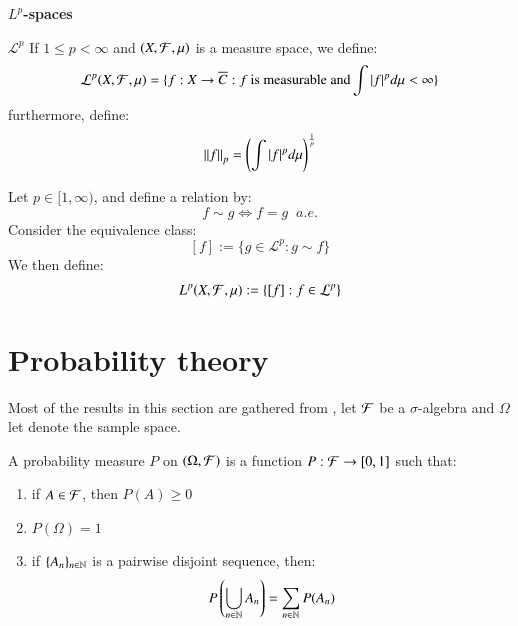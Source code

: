 \centerline{\textbf{$L^{p}$-spaces}}

\begin{definition}{\textbf{$\mathcal{L}^{p}$}}
If $1 \leq p < \infty$ and $(X,\mathcal{F}, \mu)$ is a measure space, we define: 
\begin{align*}
\mathcal{L}^{p}(X,\mathcal{F}, \mu) = 
\{
f:X \to \overline{C}: f\:\text{is measurable and}
\int |f|^{p}d\mu < \infty
\}
\end{align*}
furthermore, define: 
\begin{align*}
\norm{f}_{p} = \left(\int |f|^{p}d\mu \right)^{\frac{1}{p}}    
\end{align*}
\end{definition}

\begin{definition}[$L^{p}$]
Let $p \in [1,\infty)$, and define a relation by: 
\[
f \sim g \iff f = g\;\; a.e.
\] 
Consider the equivalence class:
\[
[f]:= \{g \in \mathcal{L}^{p}: g \sim f\}
\]
We then define: 
\begin{align*}
L^{p}(X,\mathcal{F}, \mu) := \{[f]: f\in \mathcal{L}^{p}\}    
\end{align*}
\end{definition}











\newpage 

\section{Probability theory}

Most of the results in this section are gathered from \cite{walsh2012knowing}, let $\mathcal{F}$ be a $\sigma$-algebra and $\Omega$ let denote the sample space. 

\begin{definition}
A probability measure $P$ on $(\Omega, \mathcal{F})$ is a function $P:\mathcal{F} \to [0,1]$ such that: 
\begin{enumerate}[label = (\roman*), , leftmargin=*]
    \item if $A \in \mathcal{F} $, then $P(A)\geq 0$
    \item $P(\Omega) = 1$
    \item if $\{A_{n}\}_{n\in \mathbb{N}}$ is a pairwise disjoint sequence, then: 
    \[P\left(\bigcup_{n\in \mathbb{N}}A_{n}\right) = \sum_{n\in \mathbb{N}}P(A_{n})\]
\end{enumerate}
\end{definition}

